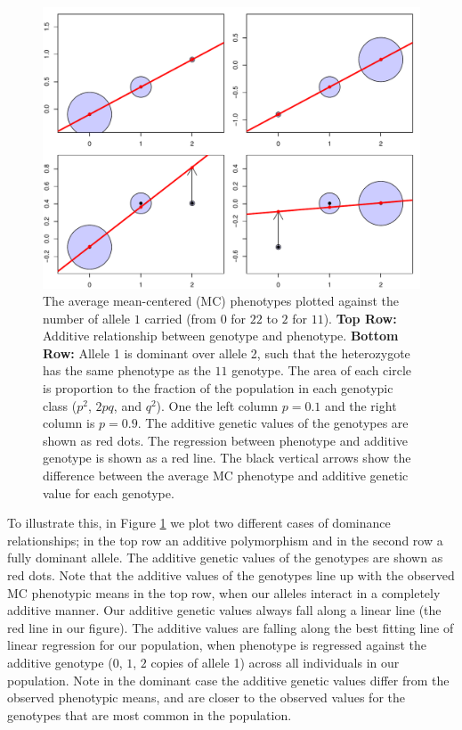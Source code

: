 \begin{figure}
\begin{center}
\includegraphics[width=\textwidth]{figures/additive_effect.pdf}
\end{center}
\caption{The average mean-centered (MC) phenotypes plotted against the
  number of allele $1$ carried (from $0$ for $22$ to $2$ for $11$). 
{\bf Top Row:} Additive relationship between genotype and phenotype. 
{\bf Bottom Row:} Allele 1 is dominant over allele 2, such that the
heterozygote has the same phenotype as the $11$ genotype. 
The area of each circle is proportion to the fraction of
the population in each genotypic class ($p^2$, $2pq$, and $q^2$). 
One the left column $p=0.1$ and the right column is $p=0.9$.
The additive genetic values of the genotypes are shown as
  red dots. The regression between phenotype and additive genotype is
  shown as a red line. The black vertical arrows show the difference
between the average MC phenotype and additive genetic value for each genotype. } \label{fig:add_dom}
\end{figure}


To illustrate this, in Figure \ref{fig:add_dom} we plot two different cases of dominance
relationships; in the top row an additive polymorphism and in the second
row a fully dominant allele. The additive genetic values of the genotypes are shown as red dots. Note that the additive values of the genotypes line up with
the observed MC phenotypic means in the top row, when our alleles interact in a
completely additive manner. Our additive genetic values always fall along a
linear line (the red line in our figure). The additive values are falling along the best
fitting line of linear regression for our population, when phenotype is
regressed against the additive genotype ($0$, $1$, $2$ copies of allele 1)
across all individuals in our population. Note in the dominant case the
additive genetic values differ from the observed phenotypic means, and are
closer to the observed values for the genotypes that are most common in the
population. \\

